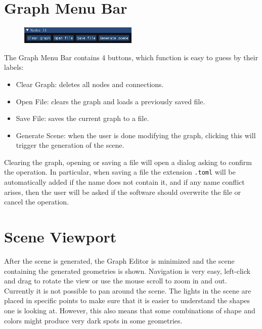 \section{Graph Menu Bar}

\begin{figure}[H]
\centering
\includegraphics[width=0.5\textwidth]{figures/graph_menu_bar.png}
\end{figure}

The Graph Menu Bar contains 4 buttons, which function is easy to guess by their labels:

\begin{itemize}
    \item Clear Graph: deletes all nodes and connections.
    \item Open File: clears the graph and loads a previously saved file.
    \item Save File: saves the current graph to a file.
    \item Generate Scene: when the user is done modifying the graph, clicking this
        will trigger the generation of the scene.
\end{itemize}

Clearing the graph, opening or saving a file will open a dialog asking to confirm the operation.
In particular, when saving a file the extension \texttt{.toml} will be automatically added if
the name does not contain it, and if any name conflict arises, then the user will be asked if
the software should overwrite the file or cancel the operation.

\section{Scene Viewport}

After the scene is generated, the Graph Editor is minimized and the scene containing the generated
geometries is shown. Navigation is very easy, left-click and drag to rotate the view or use
the mouse scroll to zoom in and out. Currently it is not possible to pan around the scene.
The lights in the scene are placed in specific points to make sure that it is easier to understand
the shapes one is looking at. However, this also means that some combinations of shape and colors
might produce very dark spots in some geometries.

